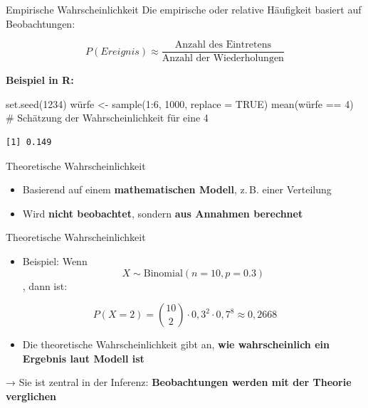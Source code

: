 \documentclass[
  ignorenonframetext,
]{beamer}
\newenvironment{Shaded}{\begin{snugshade}}{\end{snugshade}}
\newcommand{\AttributeTok}[1]{\textcolor[rgb]{0.40,0.45,0.13}{#1}}
\newcommand{\CommentTok}[1]{\textcolor[rgb]{0.37,0.37,0.37}{#1}}
\newcommand{\ConstantTok}[1]{\textcolor[rgb]{0.56,0.35,0.01}{#1}}
\newcommand{\DecValTok}[1]{\textcolor[rgb]{0.68,0.00,0.00}{#1}}
\newcommand{\FunctionTok}[1]{\textcolor[rgb]{0.28,0.35,0.67}{#1}}
\newcommand{\NormalTok}[1]{\textcolor[rgb]{0.00,0.23,0.31}{#1}}
\newcommand{\OtherTok}[1]{\textcolor[rgb]{0.00,0.23,0.31}{#1}}
\newcommand{\SpecialCharTok}[1]{\textcolor[rgb]{0.37,0.37,0.37}{#1}}
\providecommand{\tightlist}{%
  \setlength{\itemsep}{0pt}\setlength{\parskip}{0pt}}
\begin{document}
\begin{frame}[fragile]{Empirische Wahrscheinlichkeit}
\protect{}\label{empirische-wahrscheinlichkeit}
Die empirische oder relative Häufigkeit basiert auf Beobachtungen:

\[P(Ereignis) \approx \frac{\text{Anzahl des Eintretens}}{\text{Anzahl der Wiederholungen}}\]

\textbf{Beispiel in R:}

\begin{Shaded}
\begin{Highlighting}[]
\FunctionTok{set.seed}\NormalTok{(}\DecValTok{1234}\NormalTok{)}
\NormalTok{würfe }\OtherTok{\textless{}{-}} \FunctionTok{sample}\NormalTok{(}\DecValTok{1}\SpecialCharTok{:}\DecValTok{6}\NormalTok{, }\DecValTok{1000}\NormalTok{, }\AttributeTok{replace =} \ConstantTok{TRUE}\NormalTok{)}
\FunctionTok{mean}\NormalTok{(würfe }\SpecialCharTok{==} \DecValTok{4}\NormalTok{)  }\CommentTok{\# Schätzung der Wahrscheinlichkeit für eine 4}
\end{Highlighting}
\end{Shaded}

\begin{verbatim}
[1] 0.149
\end{verbatim}
\end{frame}

\begin{frame}{Theoretische Wahrscheinlichkeit}
\protect{}\label{theoretische-wahrscheinlichkeit}
\begin{itemize}
\tightlist
\item
  Basierend auf einem \textbf{mathematischen Modell}, z.\,B. einer
  Verteilung
\item
  Wird \textbf{nicht beobachtet}, sondern \textbf{aus Annahmen
  berechnet}
\end{itemize}
\end{frame}

\begin{frame}{Theoretische Wahrscheinlichkeit}
\protect{}\label{theoretische-wahrscheinlichkeit-1}
\begin{itemize}
\tightlist
\item
  Beispiel: Wenn \[X \sim \text{Binomial}(n=10, p=0.3)\], dann ist:
\end{itemize}

\[ P(X=2) = \binom{10}{2} \cdot 0{,}3^2 \cdot 0{,}7^8 \approx 0{,}2668 \]

\begin{itemize}
\tightlist
\item
  Die theoretische Wahrscheinlichkeit gibt an, \textbf{wie
  wahrscheinlich ein Ergebnis laut Modell ist}
\end{itemize}

→ Sie ist zentral in der Inferenz: \textbf{Beobachtungen werden mit der
Theorie verglichen}
\end{frame}
\end{document}
